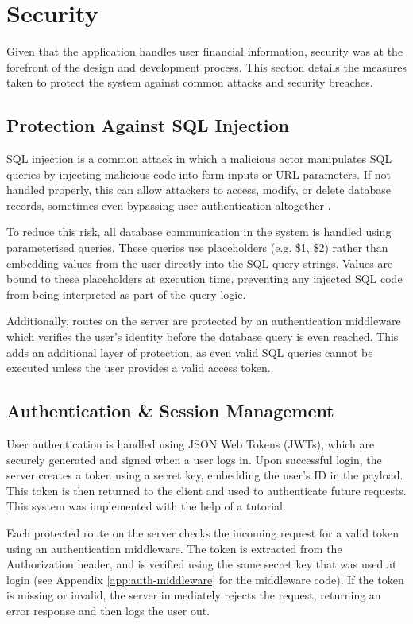 \documentclass{l4proj}
\begin{document}
\section{Security}
\label{sec:security}
Given that the application handles user financial information, security was at the forefront of the design and development process. This section details the measures taken to protect the system against common attacks and security breaches.

\subsection{Protection Against SQL Injection}
SQL injection is a common attack in which a malicious actor manipulates SQL queries by injecting malicious code into form inputs or URL parameters. If not handled properly, this can allow attackers to access, modify, or delete database records, sometimes even bypassing user authentication altogether \citep{w3_schools_sql_injection}.  

To reduce this risk, all database communication in the system is handled using parameterised queries. These queries use placeholders (e.g. \$1, \$2) rather than embedding values from the user directly into the SQL query strings. Values are bound to these placeholders at execution time, preventing any injected SQL code from being interpreted as part of the query logic. 

Additionally, routes on the server are protected by an authentication middleware which verifies the user’s identity before the database query is even reached. This adds an additional layer of protection, as even valid SQL queries cannot be executed unless the user provides a valid access token.


\subsection{Authentication \& Session Management}
\label{sec:jwt}
User authentication is handled using JSON Web Tokens (JWTs), which are securely generated and signed when a user logs in. Upon successful login, the server creates a token using a secret key, embedding the user’s ID in the payload. This token is then returned to the client and used to authenticate future requests. This system was implemented with the help of a \citet{geeksforgeeks_jwt_authentication} tutorial.

Each protected route on the server checks the incoming request for a valid token using an authentication middleware. The token is extracted from the Authorization header, and is verified using the same secret key that was used at login (see Appendix \ref{app:auth-middleware} for the middleware code). If the token is missing or invalid, the server immediately rejects the request, returning an error response and then logs the user out.
\end{document}
